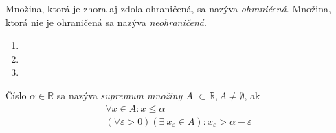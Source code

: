 Množina, ktorá je zhora aj zdola ohraničená, sa nazýva \textit{ohraničená}.
Množina, ktorá nie je ohraničená sa nazýva \textit{neohraničená}.

\begin{enumerate}[resume]
	\item {}
	\item {}
	\item {}
\end{enumerate}


Číslo $\alpha \in \mathbb{R}$ sa nazýva \textit{supremum množiny $A$}
$\subset \mathbb{R}, A \neq \emptyset$, ak
\begin{align}
\forall x \in A: x \leq \alpha \label{eq:supremum-i} \\
(\forall \varepsilon > 0) (\exists \: x_\varepsilon \in A):
x_\varepsilon > \alpha - \varepsilon
\end{align}
